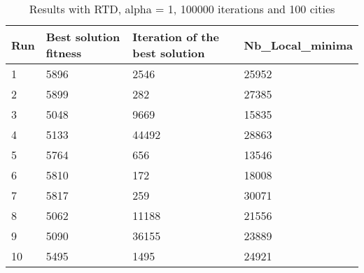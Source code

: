\documentclass[12pt,oneside,a4paper]{article}
\begin{document}
  \begin{table}[h]
  \centering
    \small
    \begin{tabular}{llll}
      \hline
      \multicolumn{1}{|l|}{\textbf{Run}}& \multicolumn{1}{l|}{\textbf{Best solution fitness}}& \multicolumn{1}{l|}{\textbf{Iteration of the best solution}}& \multicolumn{1}{l|}{\textbf{Nb\_Local\_minima}}\\ \hline
      \multicolumn{1}{|l|}{1} & \multicolumn{1}{l|}{5896}  & \multicolumn{1}{l|}{2546} & \multicolumn{1}{l|}{25952}  \\ \hline
      \multicolumn{1}{|l|}{2} & \multicolumn{1}{l|}{5899}  & \multicolumn{1}{l|}{282} & \multicolumn{1}{l|}{27385}  \\ \hline         
      \multicolumn{1}{|l|}{3} & \multicolumn{1}{l|}{5048}  & \multicolumn{1}{l|}{9669}  & \multicolumn{1}{l|}{15835}  \\ \hline
      \multicolumn{1}{|l|}{4} & \multicolumn{1}{l|}{5133}  & \multicolumn{1}{l|}{44492}  & \multicolumn{1}{l|}{28863}  \\ \hline
      \multicolumn{1}{|l|}{5} & \multicolumn{1}{l|}{5764}  & \multicolumn{1}{l|}{656}  & \multicolumn{1}{l|}{13546}  \\ \hline
      \multicolumn{1}{|l|}{6} & \multicolumn{1}{l|}{5810}  & \multicolumn{1}{l|}{172}  & \multicolumn{1}{l|}{18008}  \\ \hline
      \multicolumn{1}{|l|}{7} & \multicolumn{1}{l|}{5817}  & \multicolumn{1}{l|}{259}  & \multicolumn{1}{l|}{30071}  \\ \hline
      \multicolumn{1}{|l|}{8} & \multicolumn{1}{l|}{5062}  & \multicolumn{1}{l|}{11188} & \multicolumn{1}{l|}{21556}  \\ \hline
      \multicolumn{1}{|l|}{9} & \multicolumn{1}{l|}{5090}  & \multicolumn{1}{l|}{36155} & \multicolumn{1}{l|}{23889}  \\ \hline
      \multicolumn{1}{|l|}{10} & \multicolumn{1}{l|}{5495}  & \multicolumn{1}{l|}{1495} & \multicolumn{1}{l|}{24921}  \\ \hline
    \end{tabular}
    \caption{Results with RTD, alpha = 1, 100000 iterations and 100 cities}
  \end{table}
\end{document}
